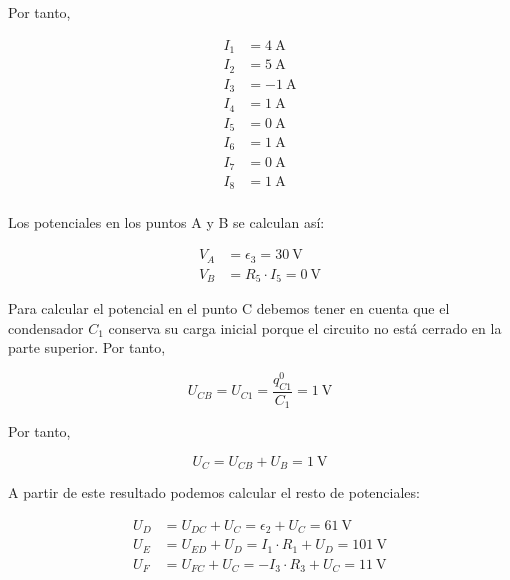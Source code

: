 Por tanto,

\begin{align*}
  I_1 &= \qty{4}{\ampere}\\
  I_2 &= \qty{5}{\ampere}\\
  I_3 &= \qty{-1}{\ampere}\\
  I_4 &= \qty{1}{\ampere}\\
  I_5 &= \qty{0}{\ampere}\\
  I_6 &= \qty{1}{\ampere}\\
  I_7 &= \qty{0}{\ampere}\\
  I_8 &= \qty{1}{\ampere}\\
\end{align*}

Los potenciales en los puntos A y B se calculan así:

\begin{align*}
  V_A &= \epsilon_3 = \qty{30}{\volt}\\
  V_B &= R_5 \cdot I_5 = \qty{0}{\volt}
\end{align*}

Para calcular el potencial en el punto C debemos tener en cuenta que el condensador $C_1$ conserva su carga inicial porque el circuito no está cerrado en la parte superior. Por tanto,

\begin{equation*}
  U_{CB} = U_{C1} = \frac{q^0_{C1} }{C_1} = \qty{1}{\volt}
\end{equation*}

Por tanto,

\begin{equation*}
  U_C = U_{CB} + U_B = \qty{1}{\volt}
\end{equation*}

A partir de este resultado podemos calcular el resto de potenciales:

\begin{align*}
  U_D &= U_{DC} + U_C = \epsilon_2 + U_C = \qty{61}{\volt}\\
  U_E &= U_{ED} + U_D = I_1 \cdot R_1 + U_D = \qty{101}{\volt}\\
  U_F &= U_{FC} + U_C = -I_3 \cdot R_3 + U_C = \qty{11}{\volt}
\end{align*}


